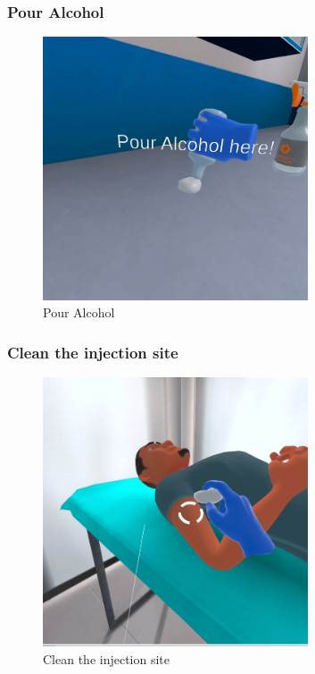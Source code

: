 \subsubsection{Pour Alcohol}
\begin{figure}[h]
	\centering
	\includegraphics[width=0.7\textwidth, height=0.3\textheight]{Images/Pour Alcohol.png}
	\caption{Pour Alcohol}
	\label{fig:Pour-Alcohol}
\end{figure}
\newpage
\subsubsection{Clean the injection site}
\begin{figure}[h]
	\centering
	\includegraphics[width=0.7\textwidth, height=0.3\textheight]{Images/Clean the injection site.png}
	\caption{Clean the injection site}
	\label{fig:Clean the injection site}
\end{figure}

